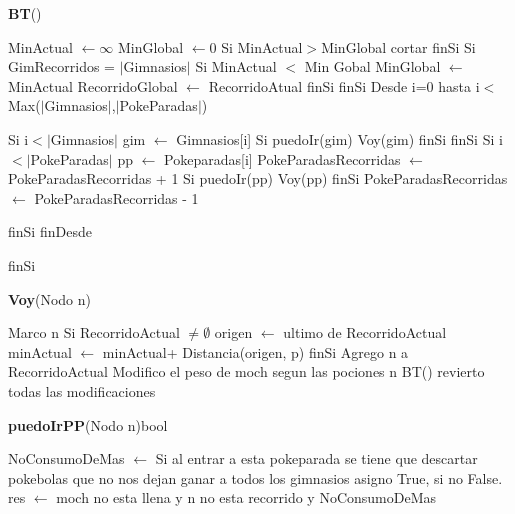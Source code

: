 \documentclass[spanish,12pt]{article}
\begin{document}
\begin{algorithm}[H]{\textbf{BT}()}
	\begin{algorithmic}[1]
		\State MinActual $\gets \infty$
		\State MinGlobal $\gets 0$
		\State Si  MinActual$>$MinGlobal  
			 \State \quad cortar
		\State finSi
		\State Si GimRecorridos = $|$Gimnasios$|$ %
		\State \quad Si MinActual $<$ Min Gobal
		\State \qquad MinGlobal $\gets$ MinActual
		\State \qquad RecorridoGlobal $\gets$ RecorridoAtual
		\State \quad finSi
		\State finSi
		\State Desde i=0 hasta i$<$Max($|$Gimnasios$|$,$|$PokeParadas$|$)
	
		\State \qquad Si i$< |$Gimnasios$|$
		\State \qquad \quad gim $\gets$ Gimnasios[i]
		\State \qquad \quad Si puedoIr(gim)
		\State \qquad \qquad Voy(gim)
 		\State \qquad finSi	
		\State \quad finSi
		\State \quad Si i $< |$PokeParadas$|$
		\State \quad pp $\gets$ Pokeparadas[i]
		\State \quad PokeParadasRecorridas $\gets$ PokeParadasRecorridas + 1 
		\State \qquad Si puedoIr(pp)
		\State \qquad Voy(pp) 	
		\State \qquad finSi
		\State \quad PokeParadasRecorridas $\gets$ PokeParadasRecorridas - 1 

		\State \quad finSi 
		\State finDesde
  		
		
		
		\State finSi
	\end{algorithmic}
\end{algorithm}

\begin{algorithm}[H]{\textbf{Voy}(Nodo n)}
	\begin{algorithmic}[1]
		\State Marco n
		\State Si RecorridoActual $ \not= \emptyset$
		\State \quad origen $\gets$ ultimo de RecorridoActual
		\State \quad minActual $\gets$ minActual+ Distancia(origen, p)
		\State finSi
		\State Agrego n a RecorridoActual
		\State Modifico el peso de moch segun las pociones n
		\State BT()
		\State revierto todas las modificaciones
	\end{algorithmic}
\end{algorithm}

\begin{algorithm}[H]{\textbf{puedoIrPP}(Nodo n){bool}}
	\begin{algorithmic}[1]
	\State NoConsumoDeMas $\gets$ Si al entrar a esta pokeparada se tiene que descartar pokebolas que no nos dejan ganar a todos los gimnasios asigno True, si no False.
	\State  res $\gets$  moch no esta llena y n no esta recorrido y NoConsumoDeMas
	\end{algorithmic}
\end{algorithm}
\end{document}
